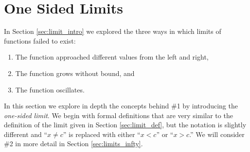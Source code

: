 \section{One Sided Limits}\label{sec:limit_continuity}

%


In Section \ref{sec:limit_intro} we explored the three ways in which limits of functions failed to exist: 
	\begin{enumerate}
	\item	The function approached different values from the left and right,
	\item	The function grows without bound, and 
	\item	The function oscillates.
	\end{enumerate}
	
In this section we explore in depth the concepts behind \#1 by introducing the \textit{one-sided limit}. We begin with formal definitions that are very similar to the definition of the limit given in Section \ref{sec:limit_def}, but the notation is slightly different and ``$x\neq c$'' is replaced with either ``$x<c$'' or ``$x>c$.'' We will consider \#2 in more detail in Section \ref{sec:limits_infty}.

